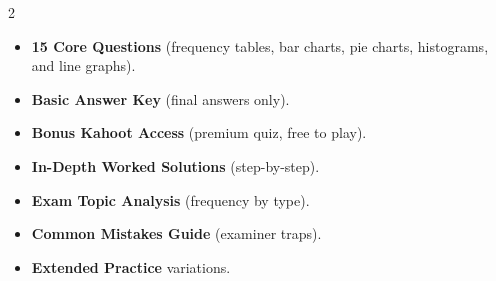 \documentclass[11pt,a4paper]{article}
\newcommand{\FullReleaseDate}{April 30, 2026}
\begin{document}
\vspace{8pt}

\begin{multicols}{2}
  \begin{tcolorbox}[card, title=\sffamily\bfseries\textcolor{white}{\faHandPointDown\ TODAY (Simplified Version)}, colbacktitle=mainblue, boxed title style={sharp corners, boxrule=0pt}]
    \begin{itemize}[leftmargin=1.2em, itemsep=2pt]
      \item \small \textbf{15 Core Questions} (frequency tables, bar charts, pie charts, histograms, and line graphs).
      \item \small \textbf{Basic Answer Key} (final answers only).
      \item \small \textbf{Bonus Kahoot Access} (premium quiz, free to play).
    \end{itemize}
  \end{tcolorbox}

  \columnbreak

  \begin{tcolorbox}[card, title=\sffamily\bfseries\textcolor{white}{\faRocket\ ON \FullReleaseDate\ (Full Upgrade)}, colbacktitle=mainblue, boxed title style={sharp corners, boxrule=0pt}]
    \begin{itemize}[leftmargin=1.2em, itemsep=2pt]
      \item \small \textbf{In-Depth Worked Solutions} (step-by-step).
      \item \small \textbf{Exam Topic Analysis} (frequency by type).
      \item \small \textbf{Common Mistakes Guide} (examiner traps).
      \item \small \textbf{Extended Practice} variations.
    \end{itemize}
  \end{tcolorbox}
\end{multicols}
\end{document}
